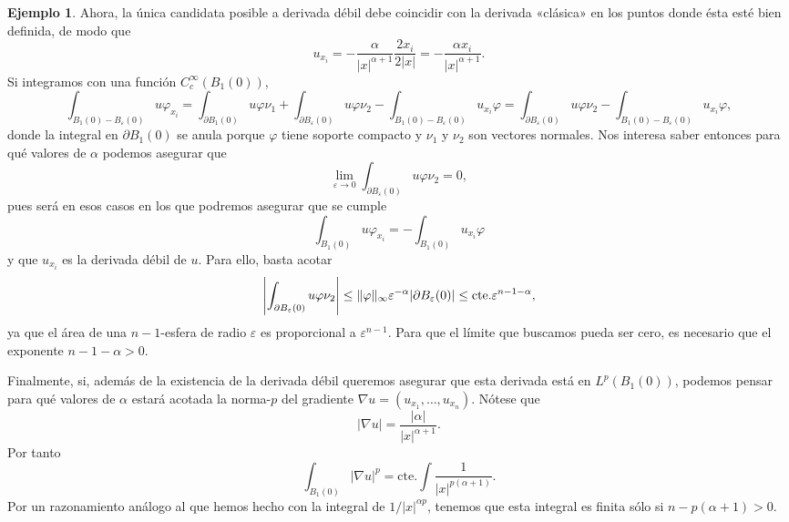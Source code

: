 \documentclass[12pt,a4paper]{book}
\DeclarePairedDelimiter\norm{\lVert}{\rVert}
\theoremstyle{definition} \newtheorem{defn}[thm]{Definición}
\theoremstyle{definition} \newtheorem{ejemplo}[thm]{Ejemplo}
\theoremstyle{definition} \newtheorem{ejercicio}[thm]{Ejercicio}
\theoremstyle{remark} \newtheorem*{obs}{Observación}
\newcommand{\cte}{\mathrm{cte.}}
\newcommand{\eps}{\varepsilon}
\begin{document}
\begin{ejemplo}
    Ahora, la única candidata posible a derivada débil debe coincidir con la derivada «clásica» en los puntos donde ésta esté bien definida, de modo que 
    \begin{equation*}
      u_{x_i}=-\frac{\alpha}{|x|^{\alpha+1}} \frac{2 x_i}{2 |x|}=- \frac{\alpha x_i}{|x|^{\alpha+1}}.
    \end{equation*}
    Si integramos con una función $C^{\infty}_c(B_1(0))$, 
    \begin{equation*}
      \int_{B_1(0)-B_{\eps}(0)}u \varphi_{x_i} = \int_{\partial B_1(0)} u \varphi \nu_1+ \int_{\partial B_\eps(0)} u \varphi \nu_2 - \int_{B_1(0)-B_{\eps}(0)} u_{x_i} \varphi =\int_{\partial B_\eps(0)} u \varphi \nu_2 - \int_{B_1(0)-B_{\eps}(0)} u_{x_i} \varphi ,
    \end{equation*}
    donde la integral en $\partial B_1(0)$ se anula porque $\varphi$ tiene soporte compacto y $\nu_1$ y $\nu_2$ son vectores normales. Nos interesa saber entonces para qué valores de $\alpha$ podemos asegurar que 
    \begin{equation*}
      \lim_{\eps \rightarrow 0}\int_{\partial B_{\eps}(0)} u \varphi \nu_2 =0,
    \end{equation*}
    pues será en esos casos en los que podremos asegurar que se cumple
    \begin{equation*}
      \int_{B_1(0)} u \varphi_{x_i} = -\int_{B_1(0)} u_{x_i} \varphi
    \end{equation*}
    y que $u_{x_i}$ es la derivada débil de $u$. Para ello, basta acotar
    \begin{equation*}
      \left| \int_{\partial B_{\eps}(0)} u \varphi \nu_2\right| \leq \norm{\varphi}_{\infty} \eps^{-\alpha} |\partial B_{\eps}(0)| \leq \cte \eps^{n-1-\alpha},
    \end{equation*}
    ya que el área de una $n-1$-esfera de radio $\eps$ es proporcional a $\eps^{n-1}$. Para que el límite que buscamos pueda ser cero, es necesario que el exponente $n-1-\alpha >0$.
    
    Finalmente, si, además de la existencia de la derivada débil queremos asegurar que esta derivada está en $L^p(B_{1}(0))$, podemos pensar para qué valores de $\alpha$ estará acotada la norma-$p$ del gradiente $\nabla u=(u_{x_1},\dots,u_{x_n})$. Nótese que
    \begin{equation*}
      |\nabla u| = \frac{|\alpha|}{|x|^{\alpha+1}}.
    \end{equation*}
    Por tanto
    \begin{equation*}
      \int_{B_1(0)} |\nabla u|^p = \cte \int\frac{1}{|x|^{p(\alpha+1)}}.
    \end{equation*}
    Por un razonamiento análogo al que hemos hecho con la integral de $1/|x|^{\alpha p}$, tenemos que esta integral es finita sólo si $n-p(\alpha+1)>0$.


\end{ejemplo}
\end{document}
